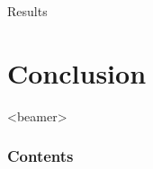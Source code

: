 \documentclass{beamer}
\begin{document}
\begin{frame}{Results}
\begin{figure}[H]
{	  
	}
  \end{figure}
\end{frame}

\section{Conclusion}
\begin{frame}<beamer>
  \frametitle{Contents}
  \tableofcontents[currentsection]
\end{frame}
\end{document}
